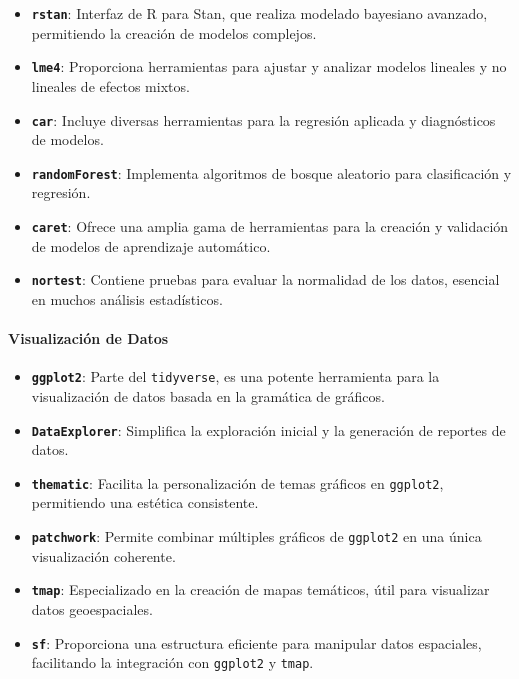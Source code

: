 \documentclass[
  12pt,
]{book}
\providecommand{\tightlist}{%
  \setlength{\itemsep}{0pt}\setlength{\parskip}{0pt}}
\begin{document}
\begin{itemize}
\tightlist
\item
  \textbf{\texttt{rstan}}: Interfaz de R para Stan, que realiza modelado bayesiano avanzado, permitiendo la creación de modelos complejos.
\item
  \textbf{\texttt{lme4}}: Proporciona herramientas para ajustar y analizar modelos lineales y no lineales de efectos mixtos.
\item
  \textbf{\texttt{car}}: Incluye diversas herramientas para la regresión aplicada y diagnósticos de modelos.
\item
  \textbf{\texttt{randomForest}}: Implementa algoritmos de bosque aleatorio para clasificación y regresión.
\item
  \textbf{\texttt{caret}}: Ofrece una amplia gama de herramientas para la creación y validación de modelos de aprendizaje automático.
\item
  \textbf{\texttt{nortest}}: Contiene pruebas para evaluar la normalidad de los datos, esencial en muchos análisis estadísticos.
\end{itemize}

\hypertarget{visualizaciuxf3n-de-datos}{%
\paragraph*{Visualización de Datos}\label{visualizaciuxf3n-de-datos}}

\begin{itemize}
\tightlist
\item
  \textbf{\texttt{ggplot2}}: Parte del \texttt{tidyverse}, es una potente herramienta para la visualización de datos basada en la gramática de gráficos.
\item
  \textbf{\texttt{DataExplorer}}: Simplifica la exploración inicial y la generación de reportes de datos.
\item
  \textbf{\texttt{thematic}}: Facilita la personalización de temas gráficos en \texttt{ggplot2}, permitiendo una estética consistente.
\item
  \textbf{\texttt{patchwork}}: Permite combinar múltiples gráficos de \texttt{ggplot2} en una única visualización coherente.
\item
  \textbf{\texttt{tmap}}: Especializado en la creación de mapas temáticos, útil para visualizar datos geoespaciales.
\item
  \textbf{\texttt{sf}}: Proporciona una estructura eficiente para manipular datos espaciales, facilitando la integración con \texttt{ggplot2} y \texttt{tmap}.
\end{itemize}
\end{document}
